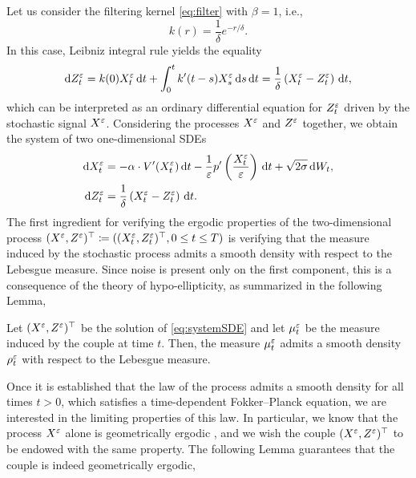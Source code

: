 \documentclass[10pt]{article}
\begin{document}
Let us consider the filtering kernel \eqref{eq:filter} with $\beta = 1$, i.e.,
\begin{equation}\label{eq:filter_beta1}
	k(r) = \frac{1}{\delta} e^{-r/\delta}.
\end{equation}
In this case, Leibniz integral rule yields the equality
\begin{equation}
	\mathrm{d} Z^\varepsilon_t = k(0) X^\varepsilon_t \,\mathrm{d} t + \int_0^t k'(t-s) X^\varepsilon_s \,\mathrm{d} s \,\mathrm{d} t = \frac{1}{\delta} \left ( X^\varepsilon_t - Z^\varepsilon_t \right ) \,\mathrm{d} t,
\end{equation}
which can be interpreted as an ordinary differential equation for $Z_t^\varepsilon$ driven by the stochastic signal $X^\varepsilon$. Considering the processes $X^\varepsilon$ and $Z^\varepsilon$ together, we obtain the system of two one-dimensional SDEs
\begin{equation}
\label{eq:systemSDE}
\begin{aligned}
\mathrm{d} X_t^\varepsilon &= -\alpha \cdot V'(X_t^\varepsilon) \,\mathrm{d} t - \frac1{\varepsilon} p'\left(\frac{X_t^\varepsilon}{\varepsilon}\right) \,\mathrm{d} t+ \sqrt{2\sigma} \,\mathrm{d} W_t, \\
\mathrm{d} Z^\varepsilon_t &= \frac{1}{\delta} \left ( X^\varepsilon_t - Z^\varepsilon_t \right ) \,\mathrm{d} t.
\end{aligned}
\end{equation}
The first ingredient for verifying the ergodic properties of the two-dimensional process $(X^\varepsilon, Z^\varepsilon)^\top \coloneqq ((X^\varepsilon_t, Z^\varepsilon_t)^\top, 0 \leq t \leq T)$ is verifying that the measure induced by the stochastic process admits a smooth density with respect to the Lebesgue measure. Since noise is present only on the first component, this is a consequence of the theory of hypo-ellipticity, as summarized in the following Lemma, 

\begin{lemma}\label{lem:density} Let $(X^\varepsilon, Z^\varepsilon)^\top$ be the solution of \eqref{eq:systemSDE} and let $\mu^\varepsilon_t$ be the measure induced by the couple at time $t$. Then, the measure $\mu^\varepsilon_t$ admits a smooth density $\rho^\varepsilon_t$ with respect to the Lebesgue measure.
\end{lemma}


Once it is established that the law of the process admits a smooth density for all times $t>0$, which satisfies a time-dependent Fokker--Planck equation, we are interested in the limiting properties of this law. In particular, we know that the process $X^\varepsilon$ alone is geometrically ergodic \cite[Theorem 4.4]{MSH02}, and we wish the couple $(X^\varepsilon, Z^\varepsilon)^\top$ to be endowed with the same property. The following Lemma guarantees that the couple is indeed geometrically ergodic, 
\end{document}
